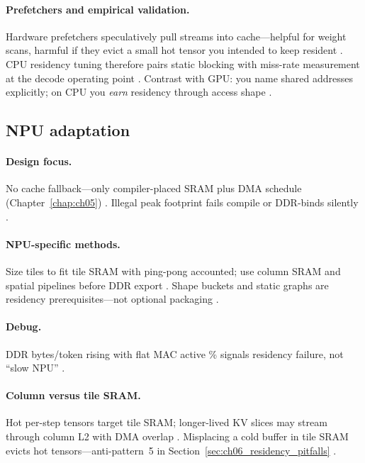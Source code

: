 \paragraph{Prefetchers and empirical validation.}
Hardware prefetchers speculatively pull streams into cache---helpful for weight scans, harmful if they evict a small hot tensor you intended to keep resident \citep{dlbook}.
CPU residency tuning therefore pairs static blocking with miss-rate measurement at the decode operating point \citep{patel2025llminference,yirage2026}.
Contrast with GPU: you name shared addresses explicitly; on CPU you \emph{earn} residency through access shape \citep{rotem2018glow,chen2020compilerbasedhardw}.

\subsection{NPU adaptation}
\label{sec:ch06_npu_residency}

\paragraph{Design focus.}
No cache fallback---only compiler-placed SRAM plus DMA schedule (Chapter~\ref{chap:ch05}) \citep{amd2024xdna,amd2024aie}.
Illegal peak footprint fails compile or DDR-binds silently \citep{yirage2026,memoryfloor2026}.

\paragraph{NPU-specific methods.}
Size tiles to fit tile SRAM with ping-pong accounted; use column SRAM and spatial pipelines before DDR export \citep{amd2024aie,dao2022flashattention}.
Shape buckets and static graphs are residency prerequisites---not optional packaging \citep{patel2025llminference,amd2024xdna}.

\paragraph{Debug.}
DDR bytes/token rising with flat MAC active \% signals residency failure, not ``slow NPU'' \citep{memoryfloor2026,taxbreak2026}.

\paragraph{Column versus tile SRAM.}
Hot per-step tensors target tile SRAM; longer-lived KV slices may stream through column L2 with DMA overlap \citep{amd2024aie,amd2024xdna,dao2023flashdecoding}.
Misplacing a cold buffer in tile SRAM evicts hot tensors---anti-pattern~5 in Section~\ref{sec:ch06_residency_pitfalls} \citep{yirage2026,patel2025llminference}.

